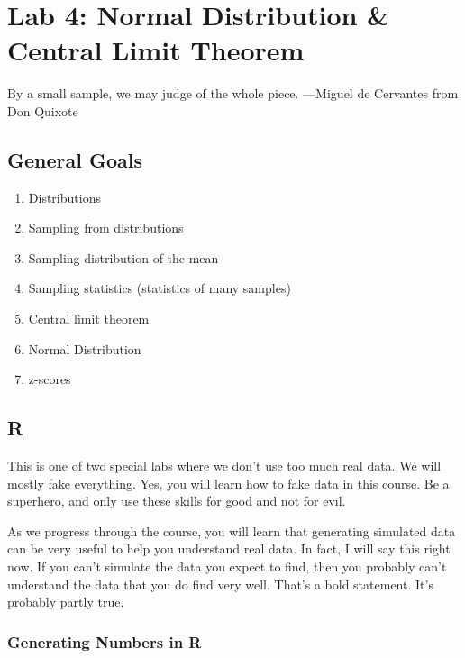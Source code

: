 \documentclass[
]{book}
\providecommand{\tightlist}{%
  \setlength{\itemsep}{0pt}\setlength{\parskip}{0pt}}
\begin{document}
\hypertarget{lab-4-normal-distribution-central-limit-theorem}{%
\chapter{Lab 4: Normal Distribution \& Central Limit Theorem}\label{lab-4-normal-distribution-central-limit-theorem}}

{By a small sample, we may judge of the whole piece. ---Miguel de
Cervantes from Don Quixote}

\hypertarget{general-goals-3}{%
\section{General Goals}\label{general-goals-3}}

\begin{enumerate}
\def\labelenumi{\arabic{enumi}.}
\tightlist
\item
  Distributions
\item
  Sampling from distributions
\item
  Sampling distribution of the mean
\item
  Sampling statistics (statistics of many samples)
\item
  Central limit theorem
\item
  Normal Distribution
\item
  z-scores
\end{enumerate}

\hypertarget{r-4}{%
\section{R}\label{r-4}}

This is one of two special labs where we don't use too much real data.
We will mostly fake everything. Yes, you will learn how to fake data in
this course. Be a superhero, and only use these skills for good and not
for evil.

As we progress through the course, you will learn that generating
simulated data can be very useful to help you understand real data. In
fact, I will say this right now. If you can't simulate the data you
expect to find, then you probably can't understand the data that you do
find very well. That's a bold statement. It's probably partly true.

\hypertarget{generating-numbers-in-r}{%
\subsection{Generating Numbers in R}\label{generating-numbers-in-r}}
\end{document}

